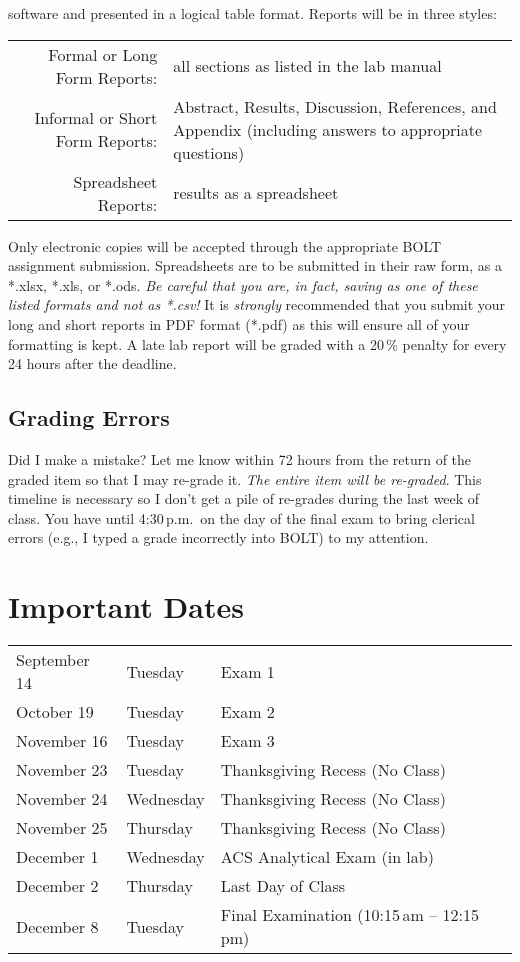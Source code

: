 \documentclass[11pt,letterpaper]{article}
\begin{document}
\begin{description}
		software and presented in a logical table format.  Reports will
		be in three styles:
		\begin{center}
			\begin{tabularx}{\linewidth} {r >{\raggedright\arraybackslash}X}
			Formal or Long Form Reports: & all sections as listed in the lab manual \\ Informal or Short Form Reports: & Abstract,
			Results, Discussion, References, and
		Appendix (including answers to appropriate questions) \\
			Spreadsheet Reports: & results as a spreadsheet
		\end{tabularx}
		\end{center}
		Only electronic copies will be accepted through the appropriate
		BOLT assignment submission. Spreadsheets are to be submitted in
		their raw form, as a *.xlsx, *.xls, or *.ods. \emph{Be careful
			that you are, in fact, saving as one of these listed
		formats and not as *.csv!} It is \emph{strongly} recommended
		that you submit your long and short reports in PDF format
		(*.pdf) as this will ensure all of your formatting is kept.  A
		late lab report will be graded with a 20\,\% penalty for every
		24 hours after the deadline.
\end{description}

\subsection{Grading Errors}
Did I make a mistake? Let me know within 72 hours from the return of the graded
item so that I may re-grade it. \emph{The entire item will be re-graded}. This
timeline is necessary so I don't get a pile of re-grades during the last week of
class. You have until 4:30\,p.m.\ on the day of the final exam to bring clerical
errors (e.g., I typed a grade incorrectly into BOLT) to my attention.

\section{Important Dates}\label{importantdates}
\begin{center}
	\begin{tabular} {l l l}
		September 14 & Tuesday    & Exam 1 \\
		October 19   & Tuesday    & Exam 2 \\
		November 16  & Tuesday    & Exam 3 \\
		November 23  & Tuesday   & Thanksgiving Recess (No Class) \\
		November 24  & Wednesday & Thanksgiving Recess (No Class) \\
		November 25  & Thursday    & Thanksgiving Recess (No Class) \\
		December 1   & Wednesday & ACS Analytical Exam (in lab) \\
		December 2   & Thursday    & Last Day of Class \\
		December 8   & Tuesday    & Final Examination (10:15\,am --
		12:15\,pm)
	\end{tabular}
\end{center}
\end{document}
